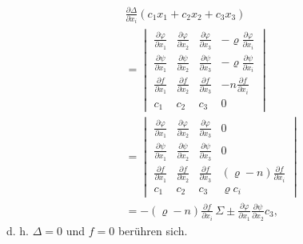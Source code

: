 \documentclass[10pt]{article}
\begin{document}
\[
\begin{aligned}
&\frac{\partial\Delta}{\partial x_i}(c_1x_1+c_2x_2+c_3x_3)\\
&=
\begin{vmatrix}
\frac{\partial\varphi}{\partial x_1}&\frac{\partial\varphi}{\partial x_2}&\frac{\partial\varphi}{\partial x_3}&-\varrho\frac{\partial\varphi}{\partial x_i}\\
\frac{\partial\psi}{\partial x_1}&\frac{\partial\psi}{\partial x_2}&\frac{\partial\psi}{\partial x_3}&-\varrho\frac{\partial\psi}{\partial x_i}\\
\frac{\partial f}{\partial x_1}&\frac{\partial f}{\partial x_2}&\frac{\partial f}{\partial x_3}&-n\frac{\partial f}{\partial x_i}\\
c_1&c_2&c_3&0
\end{vmatrix}\\
&=
\begin{vmatrix}
\frac{\partial\varphi}{\partial x_1}&\frac{\partial\varphi}{\partial x_2}&\frac{\partial\varphi}{\partial x_3}&0\\
\frac{\partial\psi}{\partial x_1}&\frac{\partial\psi}{\partial x_2}&\frac{\partial\psi}{\partial x_3}&0\\
\frac{\partial f}{\partial x_1}&\frac{\partial f}{\partial x_2}&\frac{\partial f}{\partial x_3}&(\varrho-n)\frac{\partial f}{\partial x_i}\\
c_1&c_2&c_3&\varrho c_i
\end{vmatrix}\\
&=-(\varrho-n)\frac{\partial f}{\partial x_i}\,
 \Sigma\pm
 \frac{\partial\varphi}{\partial x_1}
 \frac{\partial\psi}{\partial x_2}c_3,
\end{aligned}
\]
d. h. \(\Delta=0\) und \(f=0\) berühren sich.
\end{document}
